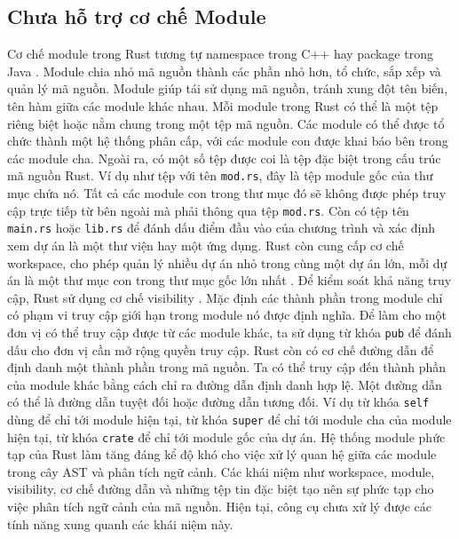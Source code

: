 \subsection{Chưa hỗ trợ cơ chế Module}

Cơ chế module trong Rust tương tự namespace trong C++ hay package trong Java \cite{rustlangManagingGrowing}.
Module chia nhỏ mã nguồn thành các phần nhỏ hơn, tổ chức, sắp xếp và quản lý mã nguồn.
Module giúp tái sử dụng mã nguồn, tránh xung đột tên biến, tên hàm giữa các module khác nhau.
Mỗi module trong Rust có thể là một tệp riêng biệt hoặc nằm chung trong một tệp mã nguồn.
Các module có thể được tổ chức thành một hệ thống phân cấp, với các module con được khai báo bên trong các module cha.
Ngoài ra, có một số tệp được coi là tệp đặc biệt trong cấu trúc mã nguồn Rust.
Ví dụ như tệp với tên \texttt{mod.rs}, đây là tệp module gốc của thư mục chứa nó.
Tất cả các module con trong thư mục đó sẽ không được phép truy cập trực tiếp từ bên ngoài mà phải thông qua tệp \texttt{mod.rs}.
Còn có tệp tên \texttt{main.rs} hoặc \texttt{lib.rs} để đánh dấu điểm đầu vào của chương trình và xác định xem dự án là một thư viện hay một ứng dụng.
Rust còn cung cấp cơ chế workspace, cho phép quản lý nhiều dự án nhỏ trong cùng một dự án lớn, mỗi dự án là một thư mục con trong thư mục gốc lớn nhất \cite{rustlangCargoWorkspaces}.
Để kiểm soát khả năng truy cập, Rust sử dụng cơ chế visibility \cite{rustlangVisibilityPrivacy}.
Mặc định các thành phần trong module chỉ có phạm vi truy cập giới hạn trong module nó được định nghĩa.
Để làm cho một đơn vị có thể truy cập được từ các module khác, ta sử dụng từ khóa \texttt{pub} để đánh dấu cho đơn vị cần mở rộng quyền truy cập.
Rust còn có cơ chế đường dẫn để định danh một thành phần trong mã nguồn.
Ta có thể truy cập đến thành phần của module khác bằng cách chỉ ra đường dẫn định danh hợp lệ.
Một đường dẫn có thể là đường dẫn tuyệt đối hoặc đường dẫn tương đối.
Ví dụ từ khóa \texttt{self} dùng để chỉ tới module hiện tại, từ khóa \texttt{super} để chỉ tới module cha của module hiện tại, từ khóa \texttt{crate} để chỉ tới module gốc của dự án.
Hệ thống module phức tạp của Rust làm tăng đáng kể độ khó cho việc xử lý quan hệ giữa các module trong cây AST và phân tích ngữ cảnh.
Các khái niệm như workspace, module, visibility, cơ chế đường dẫn và những tệp tin đặc biệt tạo nên sự phức tạp cho việc phân tích ngữ cảnh của mã nguồn.
Hiện tại, công cụ chưa xử lý được các tính năng xung quanh các khái niệm này.


